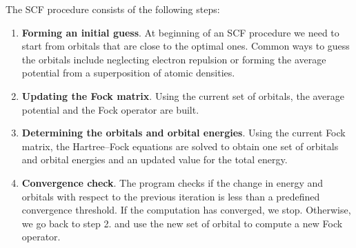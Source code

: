\documentclass[../Main/notes.tex]{subfiles}
\begin{document}
The SCF procedure consists of the following steps:
\begin{enumerate}
\item \textbf{Forming an initial guess}. At beginning of an SCF procedure we need to start from orbitals that are close to the optimal ones.
Common ways to guess the orbitals include neglecting electron repulsion or forming the average potential from a superposition of atomic densities.
\item \textbf{Updating the Fock matrix}. Using the current set of orbitals, the average potential and the Fock operator are built. 
\item \textbf{Determining the orbitals and orbital energies}. Using the current Fock matrix, the Hartree--Fock equations are solved to obtain one set of orbitals and orbital energies and an updated value for the total energy.
\item \textbf{Convergence check}. The program checks if the change in energy and orbitals with respect to the previous iteration is less than a predefined convergence threshold. If the computation has converged, we stop. Otherwise, we go back to step 2. and use the new set of orbital to compute a new Fock operator.
\end{enumerate}
\end{document}
